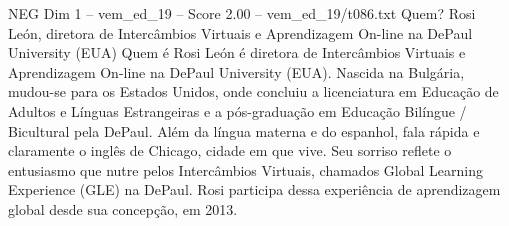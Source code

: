 \begin{textsample}{NEG Dim 1 – vem\_ed\_19 – Score 2.00 – vem\_ed\_19/t086.txt}  \label{ex:f1_neg_138}
Quem?
Rosi León, diretora de Intercâmbios Virtuais e Aprendizagem On-line na DePaul University (EUA) Quem é Rosi León é diretora de Intercâmbios Virtuais e Aprendizagem On-line na DePaul University (EUA).
Nascida na Bulgária, mudou-se para os Estados Unidos, onde concluiu a licenciatura em Educação de Adultos e Línguas Estrangeiras e a pós-graduação em Educação Bilíngue / Bicultural pela DePaul.
Além da língua materna e do espanhol, fala rápida e claramente o inglês de Chicago, cidade em que vive.
Seu sorriso reflete o entusiasmo que nutre pelos Intercâmbios Virtuais, chamados Global Learning Experience (GLE) na DePaul.
Rosi participa dessa experiência de aprendizagem global desde sua concepção, em 2013.

\end{textsample}
